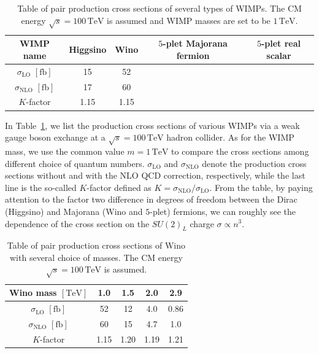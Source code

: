 \documentclass[12pt,twoside,book]{article}
\begin{document}
\begin{table}[t]
  \centering
  \begin{tabular}{c|cccc}
    WIMP name & Higgsino & Wino & $5$-plet Majorana fermion & $5$-plet real scalar \\ \hline
    $\sigma_{\mathrm{LO}}$ $[\mathrm{fb}]$ & 15 & 52 & \rem{???} & \rem{???} \\
    $\sigma_{\mathrm{NLO}}$ $[\mathrm{fb}]$ & 17 & 60 & \rem{???} & \rem{???} \\ \hline
    $K$-factor & 1.15 & 1.15 & &
  \end{tabular}
  \caption{
    Table of pair production cross sections of several types of WIMPs.
    The CM energy $\sqrt{s} = 100\,\mathrm{TeV}$ is assumed and WIMP masses are set to be $1\,\mathrm{TeV}$.
  }
  \label{tab:cross_section_WIMPs}
\end{table}

In Table~\ref{tab:cross_section_WIMPs}, we list the production cross sections of various WIMPs via a weak gauge boson exchange at a $\sqrt{s} = 100\,\mathrm{TeV}$ hadron collider.
As for the WIMP mass, we use the common value $m = 1\,\mathrm{TeV}$ to compare the cross sections among different choice of quantum numbers.
$\sigma_{\mathrm{LO}}$ and $\sigma_{\mathrm{NLO}}$ denote the production cross sections without and with the NLO QCD correction, respectively, while the last line is the so-called $K$-factor defined as $K = \sigma_{\mathrm{NLO}} / \sigma_{\mathrm{LO}}$.
From the table, by paying attention to the factor two difference in degrees of freedom between the Dirac (Higgsino) and Majorana (Wino and $5$-plet) fermions, we can roughly see the dependence of the cross section on the $SU(2)_L$ charge $\sigma \propto n^3$.

\begin{table}[t]
  \centering
  \begin{tabular}{c|cccc}
    Wino mass $\mathrm{[TeV]}$ & 1.0 & 1.5 & 2.0 & 2.9 \\ \hline
    $\sigma_{\mathrm{LO}}$ $[\mathrm{fb}]$ & 52 & 12 & 4.0 & 0.86\\
    $\sigma_{\mathrm{NLO}}$ $[\mathrm{fb}]$ & 60 & 15 & 4.7 & 1.0 \\ \hline
    $K$-factor & 1.15 & 1.20 & 1.19 & 1.21
  \end{tabular}
  \caption{
    Table of pair production cross sections of Wino with several choice of masses.
    The CM energy $\sqrt{s} = 100\,\mathrm{TeV}$ is assumed.
  }
  \label{tab:cross_section_Wino_mass}
\end{table}
\end{document}
